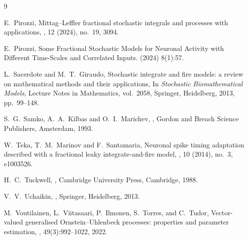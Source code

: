 \documentclass[11pt,reqno,oneside, a4paper]{amsart}
\numberwithin{equation}{section}
\theoremstyle{remark}
\begin{document}
\begin{thebibliography}{9}
    
	E.~Pirozzi,
	\newblock Mittag--Leffler fractional stochastic integrals and processes with applications,
	,
	12 (2024), no.~19, 3094.

	E.~Pirozzi,
    \newblock
	Some Fractional Stochastic Models for Neuronal Activity with Different Time-Scales and Correlated Inputs.
      (2024) 8(1):57.  

L.~Sacerdote and M.~T.~Giraudo,
\newblock Stochastic integrate and fire models: a review on mathematical 
    methods and their applications,
\newblock In {\em Stochastic Biomathematical Models}, Lecture Notes in 
    Mathematics, vol.~2058, Springer, Heidelberg, 2013, pp.~99--148.
    
	S.~G.~Samko, A.~A.~Kilbas and O.~I.~Marichev,
	,
	\newblock Gordon and Breach Science Publishers, Amsterdam, 1993.
		
	
	W.~Teka, T.~M.~Marinov and F.~Santamaria,
	\newblock Neuronal spike timing adaptation described with a fractional
	leaky integrate-and-fire model,
	,
	10 (2014), no.~3, e1003526.

H.~C.~Tuckwell,
,
\newblock Cambridge University Press, Cambridge, 1988.

	V.~V.~Uchaikin,
	,
	\newblock Springer, Heidelberg, 2013.
	
M.~Voutilainen, L.~Viitasaari, P.~Ilmonen, S.~Torres, and C.~Tudor,
\newblock Vector-valued generalised {O}rnstein--{U}hlenbeck processes: 
    properties and parameter estimation,
, 49(3):992--1022, 2022.








            
            \end{thebibliography}
\end{document}
